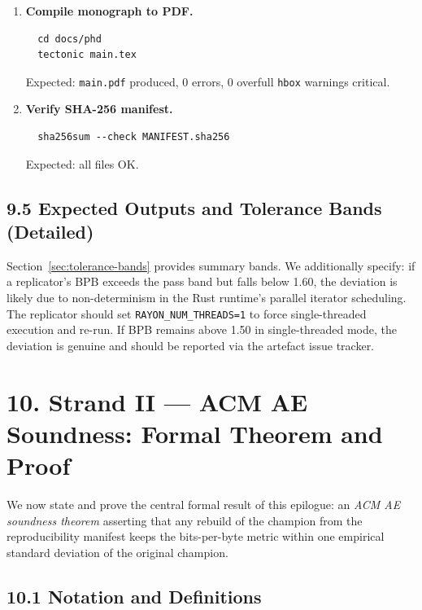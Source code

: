 \begin{enumerate}
\item \textbf{Compile monograph to PDF.}
  \begin{verbatim}
  cd docs/phd
  tectonic main.tex
  \end{verbatim}
  Expected: \texttt{main.pdf} produced, 0 errors, 0 overfull \texttt{hbox}
  warnings critical.

\item \textbf{Verify SHA-256 manifest.}
  \begin{verbatim}
  sha256sum --check MANIFEST.sha256
  \end{verbatim}
  Expected: all files OK.
\end{enumerate}

\subsection{9.5 Expected Outputs and Tolerance Bands (Detailed)}%
\label{sec:ae-tolerance-detail}

Section~\ref{sec:tolerance-bands} provides summary bands.  We additionally
specify: if a replicator's BPB exceeds the pass band but falls below 1.60,
the deviation is likely due to non-determinism in the Rust runtime's
parallel iterator scheduling.  The replicator should set
\texttt{RAYON\_NUM\_THREADS=1} to force single-threaded execution and
re-run.  If BPB remains above 1.50 in single-threaded mode, the deviation
is genuine and should be reported via the artefact issue tracker.


\section{10. Strand II — ACM AE Soundness: Formal Theorem and Proof}%
\label{sec:ae-soundness-theorem}

We now state and prove the central formal result of this epilogue: an
\emph{ACM AE soundness theorem} asserting that any rebuild of the
champion from the reproducibility manifest keeps the bits-per-byte metric
within one empirical standard deviation of the original champion.

\subsection{10.1 Notation and Definitions}\label{sec:ae-notation}

